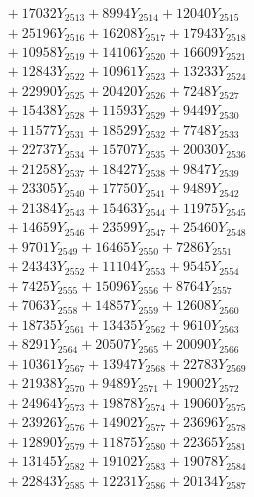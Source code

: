 \documentclass[a4paper,10pt]{article}
\begin{document}
{\begin{align}
&\;  + 17032 Y_{2513} + 8994 Y_{2514} + 12040 Y_{2515} \\[0.3ex]
&\;  + 25196 Y_{2516} + 16208 Y_{2517} + 17943 Y_{2518} \\[0.5ex]\allowbreak
&\;  + 10958 Y_{2519} + 14106 Y_{2520} + 16609 Y_{2521} \\[0.3ex]
&\;  + 12843 Y_{2522} + 10961 Y_{2523} + 13233 Y_{2524} \\[0.3ex]
&\;  + 22990 Y_{2525} + 20420 Y_{2526} + 7248 Y_{2527} \\[0.3ex]
&\;  + 15438 Y_{2528} + 11593 Y_{2529} + 9449 Y_{2530} \\[0.3ex]
&\;  + 11577 Y_{2531} + 18529 Y_{2532} + 7748 Y_{2533} \\[0.3ex]
&\;  + 22737 Y_{2534} + 15707 Y_{2535} + 20030 Y_{2536} \\[0.3ex]
&\;  + 21258 Y_{2537} + 18427 Y_{2538} + 9847 Y_{2539} \\[0.3ex]
&\;  + 23305 Y_{2540} + 17750 Y_{2541} + 9489 Y_{2542} \\[0.3ex]
&\;  + 21384 Y_{2543} + 15463 Y_{2544} + 11975 Y_{2545} \\[0.3ex]
&\;  + 14659 Y_{2546} + 23599 Y_{2547} + 25460 Y_{2548} \\[0.5ex]\allowbreak
&\;  + 9701 Y_{2549} + 16465 Y_{2550} + 7286 Y_{2551} \\[0.3ex]
&\;  + 24343 Y_{2552} + 11104 Y_{2553} + 9545 Y_{2554} \\[0.3ex]
&\;  + 7425 Y_{2555} + 15096 Y_{2556} + 8764 Y_{2557} \\[0.3ex]
&\;  + 7063 Y_{2558} + 14857 Y_{2559} + 12608 Y_{2560} \\[0.3ex]
&\;  + 18735 Y_{2561} + 13435 Y_{2562} + 9610 Y_{2563} \\[0.3ex]
&\;  + 8291 Y_{2564} + 20507 Y_{2565} + 20090 Y_{2566} \\[0.3ex]
&\;  + 10361 Y_{2567} + 13947 Y_{2568} + 22783 Y_{2569} \\[0.3ex]
&\;  + 21938 Y_{2570} + 9489 Y_{2571} + 19002 Y_{2572} \\[0.3ex]
&\;  + 24964 Y_{2573} + 19878 Y_{2574} + 19060 Y_{2575} \\[0.3ex]
&\;  + 23926 Y_{2576} + 14902 Y_{2577} + 23696 Y_{2578} \\[0.5ex]\allowbreak
&\;  + 12890 Y_{2579} + 11875 Y_{2580} + 22365 Y_{2581} \\[0.3ex]
&\;  + 13145 Y_{2582} + 19102 Y_{2583} + 19078 Y_{2584} \\[0.3ex]
&\;  + 22843 Y_{2585} + 12231 Y_{2586} + 20134 Y_{2587} \\[0.3ex]

\end{align}}
\end{document}
